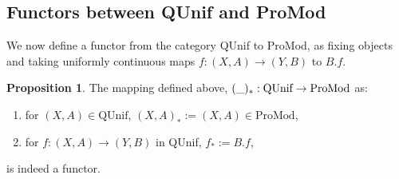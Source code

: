 \documentclass[a4paper]{article}
\theoremstyle{definition}
\newtheorem{prop}[theorem]{Proposition}
\begin{document}
			\subsection{Functors between QUnif and ProMod}
			We now define a functor from the category QUnif to ProMod, as fixing objects and taking uniformly
			continuous maps $f:(X,A)\to(Y,B)$ to $B.f$.

			\begin{prop} The mapping defined above, $(\string _)_*:\text{QUnif} \to \text{ProMod}$ as:
				\begin{enumerate}[label=(\alph*)]
					\item for $(X,A) \in \text{QUnif}$, $(X,A)_*:=(X,A) \in \text{ProMod}$,
					\item for $f:(X,A) \to (Y,B)$ in QUnif,
						$f_* := B.f$,
				\end{enumerate}
				is indeed a functor.
			\end{prop}
\end{document}
